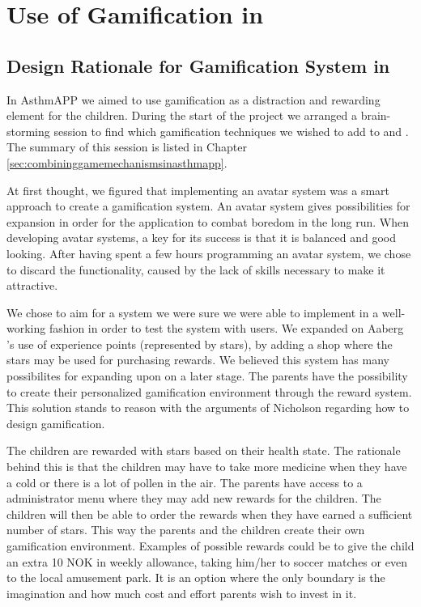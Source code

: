 \section{Use of Gamification in \app{}}
\label{sec:useofgamificationinapp}

\subsection{Design Rationale for Gamification System in \app{}}
\label{sec:designrationalegamification}
In AsthmAPP we aimed to use gamification as a distraction and rewarding element for the children. During the start of the project we arranged a brain-storming session to find which gamification techniques we wished to add to \app{} and \ab{}. The summary of this session is listed in Chapter \ref{sec:combininggamemechanismsinasthmapp}. 

At first thought, we figured that implementing an avatar system was a smart approach to create a gamification system. An avatar system gives possibilities for expansion in order for the application to combat boredom in the long run. When developing avatar systems, a key for its success is that it is balanced and good looking. After having spent a few hours programming an avatar system, we chose to discard the functionality, caused by the lack of skills necessary to make it attractive. 

We chose to aim for a system we were sure we were able to implement in a well-working fashion in order to test the system with users. We expanded on Aaberg \etal{}'s use of experience points (represented by stars), by adding a shop where the stars may be used for purchasing rewards. We believed this system has many possibilites for expanding upon on a later stage. The parents have the possibility to create their personalized gamification environment through the reward system. This solution stands to reason with the arguments of Nicholson regarding how to design gamification\cite{nicholson2012user}.

The children are rewarded with stars based on their health state. The rationale behind this is that the children may have to take more medicine when they have a cold or there is a lot of pollen in the air. The parents have access to a administrator menu where they may add new rewards for the children. The children will then be able to order the rewards when they have earned a sufficient number of stars. This way the parents and the children create their own gamification environment. Examples of possible rewards could be to give the child an extra 10 NOK in weekly allowance, taking him/her to soccer matches or even to the local amusement park. It is an option where the only boundary is the imagination and how much cost and effort parents wish to invest in it.    

